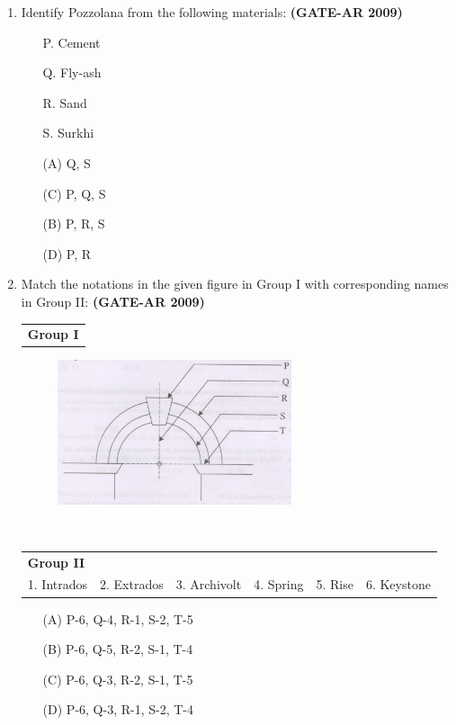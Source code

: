 \documentclass[a4paper,10pt]{article}
\begin{document}
\begin{enumerate}[label=Q.\arabic]
    \item Identify Pozzolana from the following materials: \textbf{(GATE-AR 2009)}
    \begin{itemize}
        \item[P.] Cement
        \item[Q.] Fly-ash
        \item[R.] Sand
        \item[S.] Surkhi
    \end{itemize}
    \begin{multicols}{2}
	\begin{itemize}
        \item[(A)] Q, S
        \item[(C)] P, Q, S
        \item[(B)] P, R, S
        \item[(D)] P, R
    \end{itemize}
	\end{multicols}

	\item Match the notations in the given figure in Group I with corresponding names in Group II: \textbf{(GATE-AR 2009)} \\
    \begin{tabular}{ l }
	\textbf{Group I} \\
	\end{tabular}
	\begin{figure}[h!]
        \centering
        \includegraphics[width=0.65\textwidth]{Pic04.jpg}
	\end{figure} \\
	\begin{tabular}{ l l l l l l }
	\textbf{Group II} & & & & & \\
	1. Intrados & 2. Extrados & 3. Archivolt & 4. Spring & 5. Rise & 6. Keystone \\
	\end{tabular}	
	\begin{itemize}
        \item[(A)] P-6, Q-4, R-1, S-2, T-5
        \item[(B)] P-6, Q-5, R-2, S-1, T-4
        \item[(C)] P-6, Q-3, R-2, S-1, T-5
        \item[(D)] P-6, Q-3, R-1, S-2, T-4
    \end{itemize}


\end{enumerate}
\end{document}
